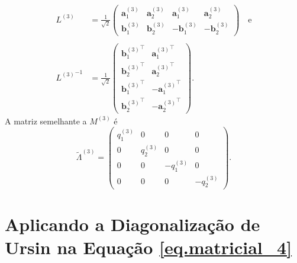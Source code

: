 \begin{align*}
L^{(3)}&=\frac{1}{\sqrt{2}}
\begin{pmatrix}
\mathbf{a}^{(3)}_1&\mathbf{a}^{(3)}_2&\mathbf{a}^{(3)}_1&\mathbf{a}^{(3)}_2\\
\mathbf{b}^{(3)}_1&\mathbf{b}^{(3)}_2&-\mathbf{b}^{(3)}_1&-\mathbf{b}^{(3)}_2
\end{pmatrix}
\quad\text{e}
\\\\
{L^{(3)}}^{-1}&=\frac{1}{\sqrt{2}}
\begin{pmatrix}
{\mathbf{b}^{(3)}_1}^{\top}&{\mathbf{a}^{(3)}_1}^{\top}\\
{\mathbf{b}^{(3)}_2}^{\top}&{\mathbf{a}^{(3)}_2}^{\top}\\
{\mathbf{b}^{(3)}_1}^{\top}&-{\mathbf{a}^{(3)}_1}^{\top}\\
{\mathbf{b}^{(3)}_2}^{\top}&-{\mathbf{a}^{(3)}_2}^{\top}
\end{pmatrix}.
\end{align*}
A matriz semelhante a $M^{(3)}$ \'e
\begin{equation*}
\tilde{\Lambda}^{(3)}=
\begin{pmatrix}
q^{(3)}_1&0&0&0\\
0&q^{(3)}_2&0&0\\
0&0&-q^{(3)}_1&0\\
0&0&0&-q^{(3)}_2
\end{pmatrix}.
\end{equation*}


\section{Aplicando a Diagonaliza\c{c}\~ao de Ursin na Equa\c{c}\~ao \ref{eq.matricial_4}}

